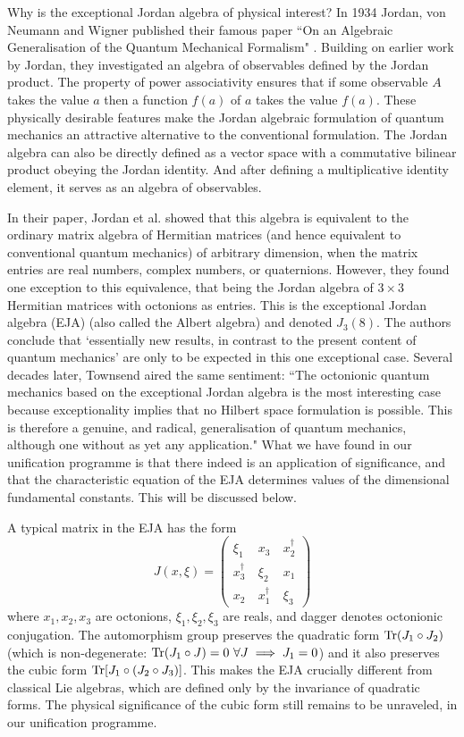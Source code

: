 \documentclass{iopconfser}
\begin{document}
Why is the exceptional Jordan algebra of physical interest? In 1934 Jordan,  von Neumann and Wigner published their famous paper  ``On an Algebraic Generalisation of the Quantum Mechanical Formalism" \cite{jvw}. 
Building on earlier work by Jordan, they investigated an algebra of observables defined by the Jordan product.
The property of power associativity ensures that if some observable $A$ takes the value $a$ then a function $f(a)$ of $a$ takes the value $f(a)$. These physically desirable features make the Jordan algebraic formulation of quantum mechanics an attractive alternative to the conventional formulation.
The Jordan algebra can also be directly defined as a vector space with a commutative bilinear product obeying the Jordan identity. And after defining a multiplicative identity element, it serves as an algebra of observables.

In their paper, Jordan et al. showed that this algebra is equivalent to the ordinary matrix algebra of Hermitian matrices (and hence equivalent to conventional quantum mechanics) of arbitrary dimension, when the matrix entries are real numbers, complex numbers, or quaternions. However, they found one exception to this equivalence, that being the Jordan algebra of $3\times 3$ Hermitian matrices with octonions as entries. This is the exceptional Jordan algebra (EJA) (also called the Albert algebra) and denoted $J_3(8)$. The authors conclude that `essentially new results, in contrast to the present content of quantum mechanics' are only to be expected in this one exceptional case. Several decades later, Townsend \cite{Townsend}
aired the same sentiment: ``The octonionic quantum mechanics based on the exceptional Jordan algebra 
 is the most interesting case because
exceptionality implies that no Hilbert space formulation is possible. This is therefore
a genuine, and radical, generalisation of quantum mechanics, although one without as
yet any application." What we have found in our unification programme is that there indeed is an application of significance, and that the characteristic equation of the EJA determines  values of the dimensional fundamental constants. This will be discussed below.

A typical matrix in the EJA has the form
\begin{equation}
J( x, \xi) = \begin{pmatrix} \xi_1 \ & x_3 \ & x_2^\dagger \\ x_3^\dagger\ & \xi_2 \ & x_1 \\ x_2 \ & x_1^\dagger \ & \xi_3\end{pmatrix}
\label{3ejamat}
\end{equation}
where $x_1, x_2, x_3$ are octonions, $\xi_1, \xi_2, \xi_3$ are reals, and dagger denotes octonionic conjugation. The automorphism group preserves the quadratic form ${\rm Tr} (J_1\circ J_2)$ (which is non-degenerate: ${\rm Tr} (J_1\circ J)=0\  \forall J\implies J_1=0$) and it also preserves the cubic form ${\rm Tr} [J_1\circ (J_2\circ J_3)]$. This makes the EJA crucially different from classical Lie algebras, which are defined only by the invariance of quadratic forms. The physical significance of the cubic form still remains to be unraveled, in our unification programme. 
\end{document}
